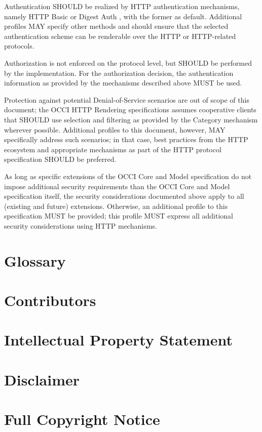 \documentclass[10pt,a4paper]{article}
\begin{document}
Authentication SHOULD be realized by HTTP authentication mechanisms,
namely HTTP Basic or Digest Auth \cite{rfc2617}, with the former as
default. Additional profiles MAY specify other methods and should
ensure that the selected authentication scheme can be renderable over
the HTTP or HTTP-related protocols.

Authorization is not enforced on the protocol level, but SHOULD be
performed by the implementation. For the authorization decision, the
authentication information as provided by the mechanisms described
above MUST be used.

Protection against potential Denial-of-Service scenarios are out of
scope of this document; the OCCI HTTP Rendering specifications assumes
cooperative clients that SHOULD use selection and filtering as
provided by the Category mechanism wherever possible. Additional
profiles to this document, however, MAY specifically address such
scenarios; in that case, best practices from the HTTP ecosystem and
appropriate mechanisms as part of the HTTP protocol specification
SHOULD be preferred.

As long as specific extensions of the OCCI Core and Model
specification do not impose additional security requirements than the
OCCI Core and Model specification itself, the security considerations
documented above apply to all (existing and future)
extensions. Otherwise, an additional profile to this specification
MUST be provided; this profile MUST express all additional security
considerations using HTTP mechanisms.

\section{Glossary}
\label{sec:glossary}

 
\section{Contributors}


\section{Intellectual Property Statement}


\section{Disclaimer}


\section{Full Copyright Notice}




\end{document}
